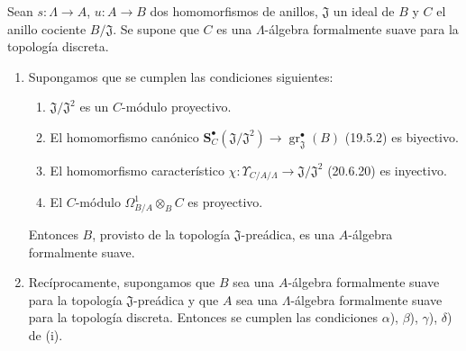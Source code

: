 \begin{theorem}[22.1.1]
\label{0.22.1.1-fr}
Sean $s:\Lambda\to A$, $u:A\to B$ dos homomorfismos de anillos,
$\mathfrak J$ un ideal de $B$ y $C$ el anillo cociente $B/\mathfrak J$. Se
supone que $C$ es una $\Lambda$-álgebra formalmente suave para la topología
discreta.
\begin{enumerate}
  \item[\textup{(i)}] Supongamos que se cumplen las condiciones siguientes:
  \begin{enumerate}
    \item[\textup{$\alpha$)}] $\mathfrak J/\mathfrak J^2$ es un $C$-módulo proyectivo.
    \item[\textup{$\beta$)}] El homomorfismo canónico
    $\mathbf S_C^\bullet(\mathfrak J/\mathfrak J^2)\to
    \operatorname{gr}_{\mathfrak J}^\bullet(B)$ \textup{(19.5.2)} es biyectivo.
    \item[\textup{$\gamma$)}] El homomorfismo característico
    $\chi:\Upsilon_{C/A/\Lambda}\to\mathfrak J/\mathfrak J^2$ \textup{(20.6.20)}
    es inyectivo.
    \item[\textup{$\delta$)}] El $C$-módulo
    $\Omega^1_{B/A}\otimes_BC$ es proyectivo.
  \end{enumerate}
  Entonces $B$, provisto de la topología $\mathfrak J$-preádica, es una
  $A$-álgebra formalmente suave.

  \item[\textup{(ii)}] Recíprocamente, supongamos que $B$ sea una $A$-álgebra
  formalmente suave para la topología $\mathfrak J$-preádica y que $A$ sea una
  $\Lambda$-álgebra formalmente suave para la topología discreta. Entonces se
  cumplen las condiciones \textup{$\alpha$), $\beta$), $\gamma$), $\delta$)} de \textup{(i)}.
\end{enumerate}
\end{theorem}

